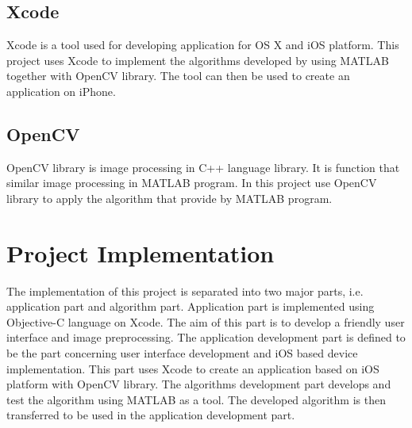 
\subsection{Xcode}
Xcode is a tool used for developing application for OS X and iOS platform. This project uses Xcode to implement the algorithms developed by using MATLAB together with OpenCV library. The tool can then be used to create an application on iPhone.

\subsection{OpenCV}
OpenCV library is image processing in C++ language library. It is function that similar image processing in MATLAB program. In this project use OpenCV library to apply the algorithm that provide by MATLAB program. 


\section{Project Implementation}
The implementation of this project is separated into two major parts, i.e. application part and algorithm part. Application part is implemented using Objective-C language on Xcode. The aim of this part is to develop a friendly user interface and image preprocessing. The application development part is defined to be the part concerning user interface development and iOS based device implementation. This part uses Xcode to create an application based on iOS platform with OpenCV library. The algorithms development part develops and test the algorithm using MATLAB as a tool. The developed algorithm is then transferred to be used in the application development part.
